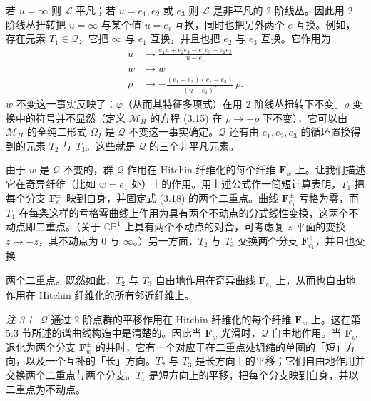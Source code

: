 \documentclass[11pt,a4paper]{article}
\begin{document}
若 $u=\infty$ 则 $\mathcal{L}$ 平凡；若 $u=e_1,e_2$ 或 $e_3$ 则 $\mathcal{L}$ 是非平凡的 $2$ 阶线丛。因此用 $2$ 阶线丛扭转把 $u=\infty$ 与某个值 $u=e_i$ 互换，同时也把另外两个 $e$ 互换。例如，存在元素 $T_1\in\mathcal{Q}$，它把 $\infty$ 与 $e_1$ 互换，并且也把 $e_2$ 与 $e_3$ 互换。它作用为
\begin{equation}\tag{3.19}
\begin{aligned}
u &\to \frac{e_1u+e_2e_3-e_1e_3-e_1e_2}{u-e_1}\\
w &\to w\\
\rho &\to -\frac{(e_1-e_2)(e_1-e_3)}{(u-e_1)^2}\,\rho.
\end{aligned}
\end{equation}
$w$ 不变这一事实反映了：$\varphi$（从而其特征多项式）在用 $2$ 阶线丛扭转下不变。$\rho$ 变换中的符号并不显然（定义 $\mathcal{M}_H$ 的方程 (3.15) 在 $\rho\to-\rho$ 下不变），它可以由 $\mathcal{M}_H$ 的全纯二形式 $\Omega_I$ 是 $\mathcal{Q}$-不变这一事实确定。$\mathcal{Q}$ 还有由 $e_1,e_2,e_3$ 的循环置换得到的元素 $T_2$ 与 $T_3$。这些就是 $\mathcal{Q}$ 的三个非平凡元素。

由于 $w$ 是 $\mathcal{Q}$-不变的，群 $\mathcal{Q}$ 作用在 Hitchin 纤维化的每个纤维 $\boldsymbol{F}_w$ 上。让我们描述它在奇异纤维（比如 $w=e_1$ 处）上的作用。用上述公式作一简短计算表明，$T_1$ 把每个分支 $\boldsymbol{F}_{e_1}^{\pm}$ 映到自身，并固定式 (3.18) 的两个二重点。曲线 $\boldsymbol{F}_{e_1}^{\pm}$ 亏格为零，而 $T_1$ 在每条这样的亏格零曲线上作用为具有两个不动点的分式线性变换，这两个不动点即二重点。（关于 $\mathbb{C}\mathbb{P}^1$ 上具有两个不动点的对合，可考虑复 $z$-平面的变换 $z\to -z$，其不动点为 $0$ 与 $\infty$。）另一方面，$T_2$ 与 $T_3$ 交换两个分支 $\boldsymbol{F}_{e_1}^{\pm}$，并且也交换


两个二重点。既然如此，$T_2$ 与 $T_3$ 自由地作用在奇异曲线 $\boldsymbol{F}_{e_1}$ 上，从而也自由地作用在 Hitchin 纤维化的所有邻近纤维上。

\bigskip
\noindent\textit{注 3.1.}\ $\mathcal{Q}$ 通过 $2$ 阶点群的平移作用在 Hitchin 纤维化的每个纤维 $\boldsymbol{F}_w$ 上。这在第 5.3 节所述的谱曲线构造中是清楚的。因此当 $\boldsymbol{F}_w$ 光滑时，$\mathcal{Q}$ 自由地作用。当 $\boldsymbol{F}_w$ 退化为两个分支 $\boldsymbol{F}_w^{\pm}$ 的并时，它有一个对应于在二重点处坍缩的单圈的「短」方向，以及一个互补的「长」方向。$T_2$ 与 $T_3$ 是长方向上的平移；它们自由地作用并交换两个二重点与两个分支。$T_1$ 是短方向上的平移，把每个分支映到自身，并以二重点为不动点。
\end{document}
